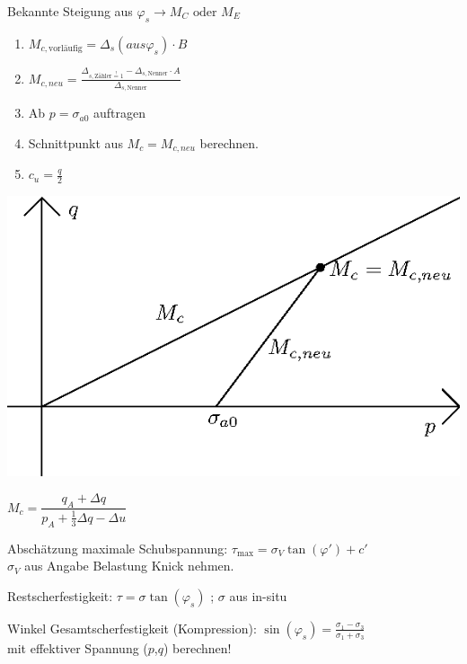\documentclass[fleqn,twoside]{article}
\begin{document}
\begin{itemize}
\begin{minipage}{0.5\textwidth}
	\item Bekannte Steigung aus $\varphi_s \rightarrow M_C \text{ oder } M_E$
	\begin{enumerate}
		\item $M_{c,\text{vorläufig}} = \Delta_{s}(aus \varphi_s) \cdot B$ 
		\item $M_{c,neu} = \frac{\Delta_{s,\text{Zähler} \overset{!}{=} 1} - \Delta_{s,\text{Nenner}} \cdot A}{\Delta_{s,\text{Nenner}}}$
		\item Ab $p = \sigma_{a0}$ auftragen
		\item Schnittpunkt aus $M_c = M_{c,neu}$ berechnen.
		\item $c_u = \frac{q}{2}$
	\end{enumerate}
\end{minipage}		
\begin{minipage}{0.4\textwidth}
	\includegraphics[width=1\textwidth]{Grafiken/Graphische_Version.eps}
\end{minipage}
    \item $M_c = \dfrac{q_A + \Delta q}{p_A + \frac{1}{3} \Delta q - \Delta u}$
	\item Abschätzung maximale Schubspannung: $\tau_{\max} = \sigma_V \tan(\varphi')+c'$\\
	$\sigma_V$ aus Angabe Belastung Knick nehmen.
	\item Restscherfestigkeit: $\tau = \sigma \tan(\varphi_s)$ ; $\sigma$ aus in-situ
	\item Winkel Gesamtscherfestigkeit (Kompression): $\sin(\varphi_s)=\frac{\sigma_1-\sigma_3}{\sigma_1+\sigma_3}$ \\
	mit effektiver Spannung ($p$,$q$) berechnen!

\end{itemize}
\end{document}
